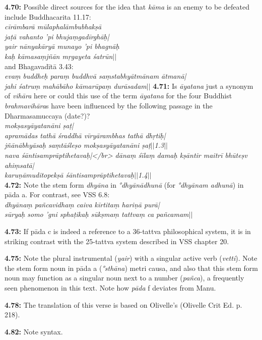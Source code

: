 \documentclass{article}
\newcommand{\vsnum}[1]{\textbf{#1}}
\newcommand{\skt}[1]{\textit{#1}}
\begin{document}
\vsnum{4.70: }Possible direct sources for the idea that \skt{kāma} is an enemy to be defeated include Buddhacarita 11.17: \\ \textit{cīrāmbarā mūlaphalāmbubhakṣā\\ jaṭā vahanto 'pi bhujaṃgadīrghāḥ|\\ yair nānyakāryā munayo 'pi bhagnāḥ\\ kaḥ kāmasaṃjñān mṛgayeta śatrūn$||$} \\ and Bhagavadītā 3.43: \\ \textit{evaṃ buddheḥ paraṃ buddhvā saṃstabhyātmānam ātmanā|\\ jahi śatruṃ mahābāho kāmarūpaṃ durāsadam$||$}  \vsnum{4.71: }Is \skt{āyatana} just a synonym of \skt{vihāra} here or could this use of the term \skt{āyatana} for the four Buddhist \skt{brahmavihāra}s have been influenced by the following passage in the Dharmasamuccaya (date?)? \\ \textit{mokṣasyāyatanāni ṣaṭ|\\ apramādas tathā śraddhā vīryārambhas tathā dhṛtiḥ|\\ jñānābhyāsaḥ saṃtāśleṣo mokṣasyāyatanāni ṣaṭ$||$1.3$||$\\ nava śāntisamprāptihetavaḥ|</br> dānaṃ śīlaṃ damaḥ kṣāntir maitrī bhūteṣv ahiṃsatā|\\ karuṇāmuditopekṣā śāntisamprāptihetavaḥ$||$1.4$||$\\}  \vsnum{4.72: }Note the stem form \skt{dhyāna} in \skt{°dhyānādhunā} (for \skt{°dhyānam adhunā}) in pāda a. For contrast, see VSS 6.8: \\ \textit{dhyānaṃ pañcavidhaṃ caiva kīrtitaṃ hariṇā purā|\\ sūryaḥ somo 'gni sphaṭikaḥ sūkṣmaṃ tattvaṃ ca pañcamam$||$}

\vsnum{4.73: }If pāda c is indeed a reference to a 36-tattva philosophical system, it is in striking contrast with the 25-tattva system described in VSS chapter 20.

\vsnum{4.75: }Note the plural instrumental (\skt{yair}) with a singular active verb (\skt{vetti}). Note the stem form noun in pāda a (\skt{°sthāna}) metri causa, and also that this stem form noun may function as a singular noun next to a number (\skt{pañca}), a frequently seen phenomenon in this text. Note how \skt{pāda} f deviates from Manu.

\vsnum{4.78: }The translation of this verse is based on Olivelle's (Olivelle Crit Ed. p. 218).

\vsnum{4.82: }Note syntax.
\end{document}
